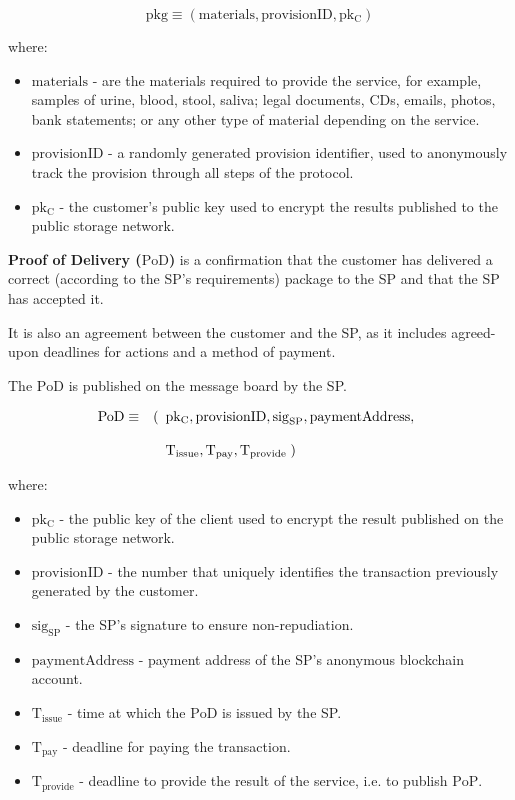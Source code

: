 \documentclass[pdftex,twocolumn,epjc3]{svjour3}
\begin{document}
{$$\mathrm{pkg} \equiv (\mathrm{materials}, \mathrm{provisionID}, \mathrm{pk_C})$$

where:

\begin{itemize}

\item $\mathrm{materials}$ - are the materials required to provide the service, for example, samples of urine, blood, stool, saliva; legal documents, CDs, emails, photos, bank statements; or any other type of material depending on the service.
\item $\mathrm{provisionID}$ - a randomly generated provision identifier, used to anonymously track the provision through all steps of the protocol.
\item $\mathrm{pk_C}$ - the customer's public key used to encrypt the results published to the public storage network.
\end{itemize}

\noindent \textbf
{Proof of Delivery ($\mathrm{PoD}$)}\label{proof-of-delivery} is a confirmation that the customer has delivered a correct (according to the SP's requirements) package to the SP and that the SP has accepted it.

It is also an agreement between the customer and the SP, as it includes agreed-upon deadlines for actions and a method of payment.

The $\mathrm{PoD}$ is published on the message board by the SP. 

\begin{eqnarray}
\mathrm{PoD} & \equiv & (\begin{array}[t]{l}\mathrm{pk_C}, \mathrm{provisionID},  \mathrm{sig}_\mathrm{SP}, \mathrm{paymentAddress}, \\\\ 
\mathrm{T}_\mathrm{issue}, \mathrm{T}_\mathrm{pay}, \mathrm{T}_\mathrm{provide}\; )\end{array}
\end{eqnarray}

where:

\begin{itemize}
\item $\mathrm{pk_C}$ - the public key of the client used to encrypt the result published on the public storage network.
\item $\mathrm{provisionID}$ - the number that uniquely identifies the transaction previously generated by the customer.
\item $\mathrm{sig}_\mathrm{SP}$ - the SP's signature to ensure non-repudiation.
\item $\mathrm{paymentAddress}$ - payment address of the SP's anonymous blockchain account.
\item $\mathrm{T}_\mathrm{issue}$ - time at which the $\mathrm{PoD}$ is issued by the SP.
\item
  $\mathrm{T}_\mathrm{pay}$ - deadline for paying the transaction.
\item
  $\mathrm{T}_\mathrm{provide}$ - deadline to provide the result of the service, i.e. to publish $\mathrm{PoP}$.
\end{itemize}

}
\end{document}
